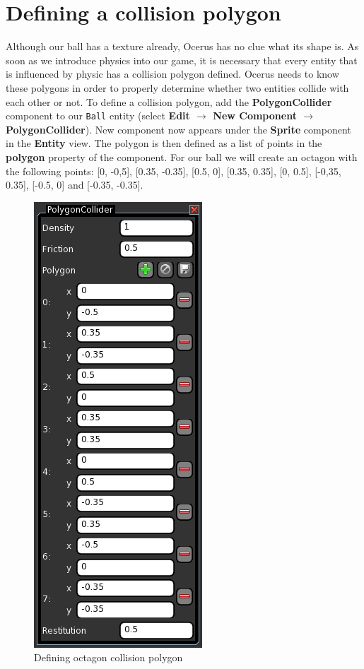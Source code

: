 \documentclass[a4paper,12pt]{article}
\begin{document}
\section{Defining a collision polygon}
Although our ball has a texture already, Ocerus has no clue what its shape is. As soon as we introduce physics into our game, it is necessary that every entity that is influenced by physic has a collision polygon defined. Ocerus needs to know these polygons in order to properly determine whether two entities collide with each other or not. To define a collision polygon, add the \textbf{PolygonCollider} component to our \texttt{Ball} entity (select \textbf{Edit $\to$ New Component $\to$ PolygonCollider}). New component now appears under the \textbf{Sprite} component in the \textbf{Entity} view. The polygon is then defined as a list of points in the \textbf{polygon} property of the component. For our ball we will create an octagon with the following points: [0, -0,5], [0.35, -0.35], [0.5, 0], [0.35, 0.35], [0, 0.5], [-0,35, 0.35], [-0.5, 0] and [-0.35, -0.35].

\begin{figure}
\capstart
\begin{center}
  \includegraphics[scale=0.65]{PolygonCollider}
 \end{center}
 \caption{Defining octagon collision polygon}
 \label{fig:polygon_collider}
\end{figure}
\end{document}
